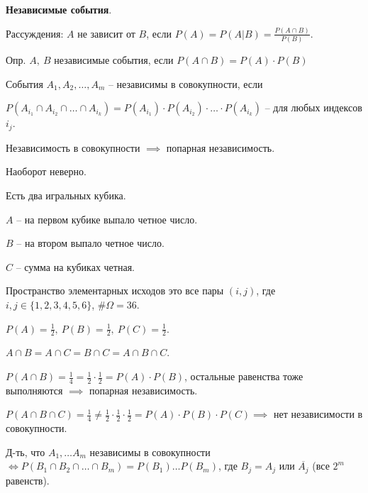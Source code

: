 \begin{definition}
    \textbf{Независимые события}.

    Рассуждения: $A$ не зависит от $B$, если $P(A) = P(A | B) = \frac{P(A \cap B)}{P(B)}$.

    Опр. $A, \ B$ независимые события, если $P(A \cap B) = P(A) \cdot P(B)$
\end{definition}

\begin{definition}
    События $A_1, A_2, \dots, A_m$ -- независимы в совокупности, если 

    $P(A_{i_1} \cap A_{i_2} \cap \dots \cap A_{i_k}) = P(A_{i_1}) \cdot P(A_{i_2}) \cdot \dots \cdot P(A_{i_k})$ -- для любых индексов $i_j$.
\end{definition}

\begin{remark}
    Независимость в совокупности $\implies$ попарная независимость.

    Наоборот неверно.
\end{remark}

\begin{example}
    Есть два игральных кубика.

    $A$ -- на первом кубике выпало четное число.

    $B$ -- на втором выпало четное число.

    $C$ -- сумма на кубиках четная.

    Пространство элементарных исходов это все пары $(i, j)$, где $i, j \in \{ 1, 2, 3, 4, 5, 6 \}$, $\#\Omega = 36$.

    $P(A) = \frac{1}{2}, \ P(B) = \frac{1}{2}, \ P(C) = \frac{1}{2}$.

    $A \cap B = A \cap C = B \cap C = A \cap B \cap C$.

    $P(A \cap B) = \frac{1}{4} = \frac{1}{2} \cdot \frac{1}{2} = P(A) \cdot P(B)$, остальные равенства тоже выполняются $\implies$ попарная независимость.

    $P(A \cap B \cap C) = \frac{1}{4} \not = \frac{1}{2} \cdot \frac{1}{2} \cdot \frac{1}{2} = P(A) \cdot P(B) \cdot P(C) \implies$ нет независимости в совокупности.
\end{example}

\begin{exerc}
    Д-ть, что $A_1, \dots A_m$ независимы в совокупности $\Leftrightarrow P(B_1 \cap B_2 \cap \dots \cap B_m) = P(B_1) \dots P(B_m)$, где $B_j = A_j$ или $\overline{A_j}$ (все $2^m$ равенств).
\end{exerc}

